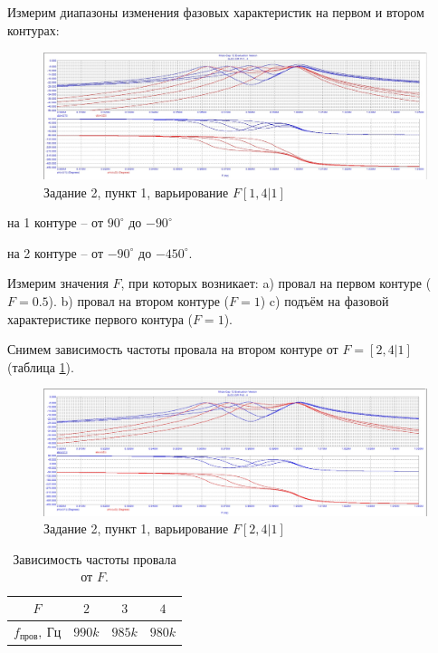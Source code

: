 \documentclass[a4paper, 14pt]{extarticle}%
\begin{document}
\subsection{}

Измерим диапазоны изменения фазовых характеристик на первом и втором контурах:

\begin{figure}[h!]
	\centering
			\includegraphics[width=1.1\linewidth]{2.1_varF1.jpg}
            \caption{Задание 2,  пункт 1, варьирование $F  [1, 4|1]$}
	\label{A}
\end{figure}


на 1 контуре -- от $90^{\circ}$ до $-90^{\circ}$

на 2 контуре -- от $-90^{\circ}$ до $-450^{\circ}$.

Измерим значения $F$, при которых возникает:
\newline
a) провал на первом контуре ($F = 0.5$).
\newline
b) провал на втором контуре ($F = 1$) c) подъём на фазовой характеристике первого контура ($F = 1$).

Снимем зависимость частоты провала на втором контуре от $F = [2, 4|1]$ (таблица \ref{t3}).

\begin{figure}[h!]
	\centering
			\includegraphics[width=1.1\linewidth]{2.1_varF2.jpg}
            \caption{Задание 2,  пункт 1, варьирование $F  [2, 4|1]$}
	\label{A}
\end{figure}


\begin{table}[H]
	\centering
	\caption{Зависимость частоты провала от $F$. }
	\label{t3}
	\begin{tabular}{c|ccc} \toprule
		$F$               & $2$    & $3$    & $4$    \\ \midrule
		$f_{\text{пров}},~\text{Гц}$ & $990k$ & $985k$ & $980k$ \\ \bottomrule
	\end{tabular}
\end{table}
\end{document}
